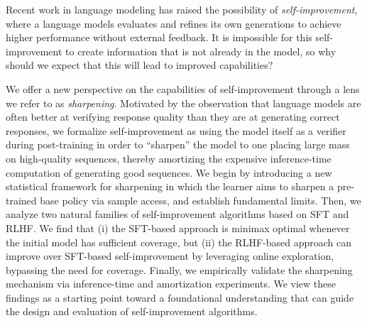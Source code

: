 Recent work in language modeling has raised the possibility of
\emph{self-improvement}, where a language models evaluates and refines its own
generations to achieve higher performance without external feedback. 
It is impossible for
this self-improvement to create information that is not already in the
model, so
why should we expect that this will lead to
improved capabilities? 

We offer a new perspective on the capabilities of self-improvement
through a lens we refer to as \emph{sharpening}. Motivated by the observation
that language models are often better at verifying response quality than they are at generating correct
responses, we formalize self-improvement
        as using the model itself as a verifier during
        post-training in order to ``sharpen'' the model to one
        placing large mass on high-quality sequences, thereby amortizing the expensive
        inference-time computation of generating good sequences. We begin by introducing a new statistical framework
        for sharpening in which the learner aims to sharpen a
        pre-trained base policy via sample access, and establish
        fundamental limits. Then,
        we analyze two natural families of self-improvement algorithms based on SFT and
RLHF. We find that (i)
the SFT-based approach is minimax optimal whenever the
initial model has sufficient coverage, but (ii) the RLHF-based approach
can improve over SFT-based self-improvement by leveraging
online exploration, bypassing the need for
coverage. Finally, we empirically validate the sharpening mechanism via inference-time and amortization experiments. We view these findings as a starting point toward a foundational
understanding that can guide the design and evaluation of self-improvement
algorithms. \loose




